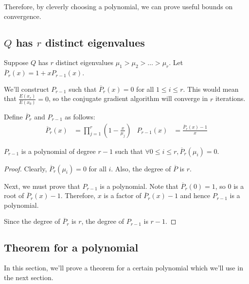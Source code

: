 Therefore, by cleverly choosing a polynomial, we can prove useful bounds on convergence.

\subsection{\texorpdfstring{$Q$}{Q} has \texorpdfstring{$r$}{r} distinct eigenvalues}

Suppose $Q$ has $r$ distinct eigenvalues $\mu_1 > \mu_2 > \ldots > \mu_r$.
Let $\overline{P}_r(x) = 1 + x P_{r-1}(x)$.

We'll construct $P_{r-1}$ such that $\overline{P}_r(x) = 0$ for all $1 \le i \le r$.
This would mean that $\frac{E(x_r)}{E(x_0)} = 0$, so
the conjugate gradient algorithm will converge in $r$ iterations.

Define $\overline{P}_r$ and $P_{r-1}$ as follows:
\begin{align*}
\overline{P}_r(x) &= \prod_{j=1}^r \left( 1 - \frac{x}{\mu_j} \right)
& P_{r-1}(x) &= \frac{\overline{P}_r(x)-1}{x}
\end{align*}

\begin{lemma}
\label{thm:p-is-poly}
$P_{r-1}$ is a polynomial of degree $r-1$ such that $\forall 0 \le i \le r, \overline{P}_r(\mu_i) = 0$.
\end{lemma}
\begin{proof}
Clearly, $\overline{P}_r(\mu_i) = 0$ for all $i$. Also, the degree of $\overline{P}$ is $r$.

Next, we must prove that $P_{r-1}$ is a polynomial.
Note that $\overline{P}_r(0) = 1$, so $0$ is a root of $\overline{P}_r(x) - 1$.
Therefore, $x$ is a factor of $\overline{P}_r(x)-1$
and hence $P_{r-1}$ is a polynomial.

Since the degree of $\overline{P}_r$ is $r$, the degree of $P_{r-1}$ is $r-1$.
\end{proof}

\subsection{Theorem for a polynomial}

In this section, we'll prove a theorem for a certain polynomial which we'll use in the next section.

